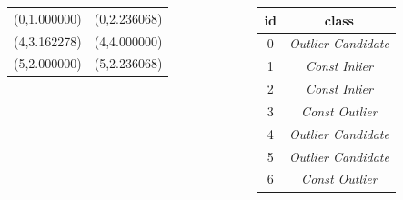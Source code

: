\documentclass{beamer}
\begin{document}
\begin{frame}
{\begin{columns}
\begin{column}{.5\textwidth}
\begin{tabular}{|c|c|}
                    \hline
                    (0,1.000000) &  (0,2.236068) \\
                    (4,3.162278) &  (4,4.000000) \\
                    (5,2.000000) &  (5,2.236068) \\
                    \hline
                \end{tabular}
            \end{column}
            \begin{column}{.5\textwidth}
                \begin{tabular}{|c|c|}
                    \hline
                    id & class \\
                    \hline
                    0 & \textit{Outlier Candidate} \\
                    1 & \textit{Const Inlier} \\
                    2 & \textit{Const Inlier} \\
                    3 & \textit{Const Outlier} \\
                    4 & \textit{Outlier Candidate} \\
                    5 & \textit{Outlier Candidate} \\
                    6 & \textit{Const Outlier} \\
                    \hline
                \end{tabular}
            \end{column}
        \end{columns}
    }
\end{frame}
\end{document}
